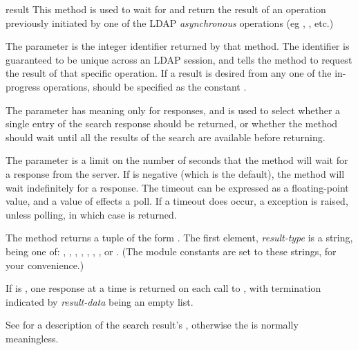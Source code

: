 \begin{methoddesc}[LDAP]{result}{} %
This method is used to wait for and return the result of an operation
previously initiated by one of the LDAP \emph{asynchronous} operations
(eg , , etc.) 

The  parameter is the integer identifier returned by that
method. 
The identifier is guaranteed to be unique across an LDAP session,
and tells the  method to request the result of that
specific operation.
If a result is desired from any one of the in-progress operations,
 should be specified as the constant .

The 
parameter has meaning only for  responses,
and is used to select 
whether a single entry of the search response should be returned, or whether
the  method should wait until all the results of the search 
are available before returning. 

The  parameter is a limit on the number of seconds that the
method will wait for a response from the server. 
If  is negative (which is the default),
the method will wait indefinitely for a response.
The timeout can be expressed as a floating-point value, and
a value of  effects a poll.
If a timeout does occur, a  exception is raised,
unless polling, in which case  is returned.

The  method returns a tuple of the form 
.
The first element, \textit{result-type} is a string, being one of:
, ,
, 
, , , 
, or .
(The module constants  are set to these strings,
for your convenience.)

If  is , one response at a time is returned on
each call to , with termination indicated by 
\textit{result-data} being an empty list.

See  for a description of the search result's 
, otherwise the  is normally meaningless.

\end{methoddesc}

